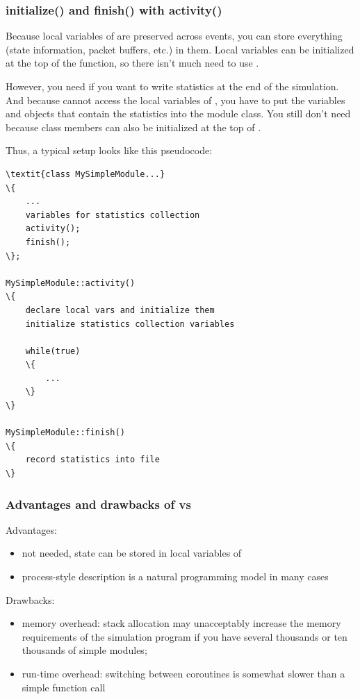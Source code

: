 \subsubsection{initialize() and finish() with activity()}


Because local variables of  are preserved across
events, you can store everything (state information, packet buffers,
etc.) in them. Local variables can be initialized at the top of the
 function, so there isn't much need to use
.


However, you need  if you want to write statistics at
the end of the simulation. And because  cannot access
the local variables of , you have to put the variables
and objects that contain the statistics into the module class.
You still don't need  because class members can also
be initialized at the top of .


Thus, a typical setup looks like this pseudocode:


\begin{Verbatim}[commandchars=\\\{\}]
\textit{class MySimpleModule...}
\{
    ...
    variables for statistics collection
    activity();
    finish();
\};

MySimpleModule::activity()
\{
    declare local vars and initialize them
    initialize statistics collection variables

    while(true)
    \{
        ...
    \}
\}

MySimpleModule::finish()
\{
    record statistics into file
\}
\end{Verbatim}



\subsubsection{Advantages and drawbacks of  vs }

Advantages:
\begin{itemize}
\item{ not needed, state can be stored in local
    variables of }
\item{process-style description is a natural programming model in many
    cases}
\end{itemize}

Drawbacks:
\begin{itemize}
\item{memory overhead: stack allocation may unacceptably increase the
    memory requirements of the simulation program if you have several
    thousands or ten thousands of simple modules;}
\item{run-time overhead: switching between coroutines is somewhat slower
    than a simple function call}
\end{itemize}


